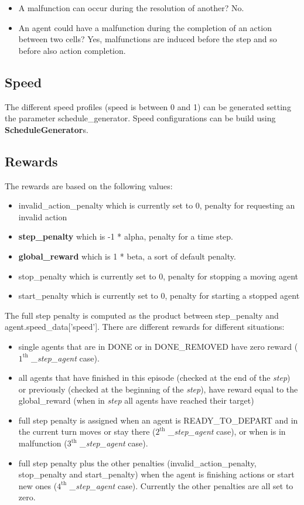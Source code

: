 \documentclass[11pt, a4paper, hidelinks]{report}
\begin{document}
\begin{itemize}
	\item A malfunction can occur during the resolution of another?
No.
	\item An agent could have a malfunction during the completion of an action between two cells?
Yes, malfunctions are induced before the step and so before also action completion.
\end{itemize}

\subsection{Speed}\label{subsec:speed}
The different speed profiles (speed is between 0 and 1) can be generated setting the parameter schedule\_generator.
Speed configurations can be build using \textbf{ScheduleGenerator}s.

\subsection{Rewards}\label{subsec:rewards}
The rewards are based on the following values:
\begin{itemize}
	\item invalid\_action\_penalty which is currently set to 0, penalty for requesting an invalid action
	\item \textbf{step\_penalty} which is -1 * alpha, penalty for a time step.
	\item \textbf{global\_reward} which is 1 * beta, a sort of default penalty.
	\item stop\_penalty which is currently set to 0, penalty for stopping a moving agent
	\item start\_penalty which is currently set to 0, penalty for starting a stopped agent
\end{itemize}

The full step penalty is computed as the product between step\_penalty and \\ agent.speed\_data['speed'].
There are different rewards for different situations:

\begin{itemize}
	\item single agents that are in DONE or in DONE\_REMOVED have zero reward ($1^{\text{th}}$ \textit{\_step\_agent} case).
	\item all agents that have finished in this episode (checked at the end of the \textit{step}) or previously (checked at the beginning of the \textit{step}), have reward equal to the global\_reward (when in \textit{step} all agents have reached their target)
	\item full step penalty is assigned when an agent is READY\_TO\_DEPART and in the current turn moves or stay there ($2^{\text{th}}$ \textit{\_step\_agent} case), or when is in malfunction ($3^{\text{th}}$ \textit{\_step\_agent} case).
	\item full step penalty plus the other penalties (invalid\_action\_penalty, stop\_penalty and start\_penalty) when the agent is finishing actions or start new ones ($4^{\text{th}}$ \textit{\_step\_agent} case).
Currently the other penalties are all set to zero.
\end{itemize}
\end{document}
